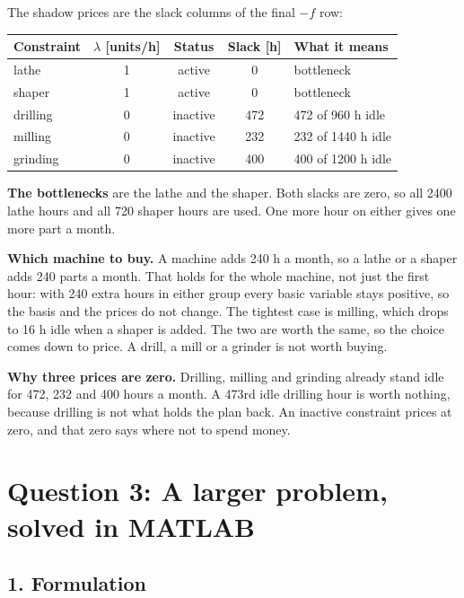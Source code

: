 \documentclass[11pt,a4paper]{article}
\begin{document}
The shadow prices are the slack columns of the final $-f$ row:

\begin{center}
\begin{tabular}{lcccl}
\toprule
Constraint & $\lambda$ [units/h] & Status & Slack [h] & What it means \\
\midrule
lathe    & 1 & active   & 0   & bottleneck \\
shaper   & 1 & active   & 0   & bottleneck \\
drilling & 0 & inactive & 472 & 472 of 960 h idle \\
milling  & 0 & inactive & 232 & 232 of 1440 h idle \\
grinding & 0 & inactive & 400 & 400 of 1200 h idle \\
\bottomrule
\end{tabular}
\end{center}

\textbf{The bottlenecks} are the lathe and the shaper. Both slacks are zero, so
all 2400 lathe hours and all 720 shaper hours are used. One more hour on either
gives one more part a month.

\textbf{Which machine to buy.} A machine adds 240 h a month, so a lathe or a
shaper adds 240 parts a month. That holds for the whole machine, not just the
first hour: with 240 extra hours in either group every basic variable stays
positive, so the basis and the prices do not change. The tightest case is
milling, which drops to 16 h idle when a shaper is added. The two are worth the
same, so the choice comes down to price. A drill, a mill or a grinder is not
worth buying.

\textbf{Why three prices are zero.} Drilling, milling and grinding already stand
idle for 472, 232 and 400 hours a month. A 473rd idle drilling hour is worth
nothing, because drilling is not what holds the plan back. An inactive
constraint prices at zero, and that zero says where not to spend money.

\newpage
\section*{Question 3: A larger problem, solved in MATLAB}

\subsection*{1. Formulation}
\end{document}
